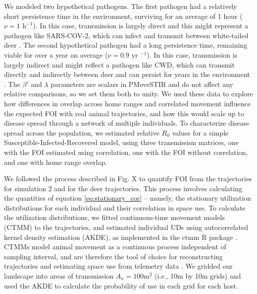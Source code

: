 \documentclass[letterpaper]{article}
\begin{document}
We modeled two hypothetical pathogens. The first pathogen had a relatively short persistence time in the environment, surviving for an average of 1 hour  ($\nu=1\text{ h}^{-1 }$). In this case, transmission is largely direct and this might represent a pathogen like SARS-COV-2, which can infect and transmit between white-tailed deer \citep{Hale2022}. The second hypothetical pathogen had a long persistence time, remaining viable for over a year on average ($\nu=0.9 \text{ yr }^{-1}$). In this case, transmission is largely indirect and might reflect a pathogen like CWD, which can transmit directly and indirectly between deer and can persist for years in the environment \citep{Saunders2012a}. The $\beta'$ and $\lambda$ parameters are scalars in PMoveSTIR and do not affect any relative comparisons, so we set them both to unity. %
We used these data to explore how differences in overlap across home ranges and correlated movement influence the expected FOI with real animal trajectories, and how this would scale up to disease spread through a network of multiple individuals. To characterize disease spread across the population, we estimated relative $R_0$ values for a simple Susceptible-Infected-Recovered model, using three transmission matrices, one with the FOI estimated using correlation, one with the FOI without correlation, and one with home range overlap.  %

We followed the process described in Fig. X to quantify FOI from the trajectories for simulation 2 and for the deer trajectories. This process involves calculating the quantities of equation \ref{eq:stationary_cor} -- namely, the stationary utilization distributions for each individual and their correlation in space use.  To calculate the utilization distributions, we fitted continuous-time movement models (CTMM) to the trajectories, and estimated individual UDs using autocorrelated kernel density estimation (AKDE), as implemented in the ctmm R package \citep{Fleming2014, Calabrese2016,Fleming2022}. CTMMs model animal movement as a continuous process independent of sampling interval, and are therefore the tool of choice for reconstructing trajectories and estimating space use from telemetry data \citep{Fleming2014}. We gridded our landscape into areas of transmission $A_x = 100 \text{m}^2$ (i.e., 10m by 10m grids) and used the AKDE to calculate the probability of use in each grid for each host.    %
\end{document}
